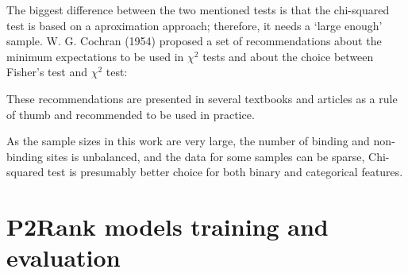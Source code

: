 The biggest difference between the two mentioned tests is that the chi-squared test is based on a aproximation approach; therefore, it needs a `large enough' sample. W. G. Cochran (1954) \cite{cochran} proposed a set of recommendations about the minimum expectations to be used in $\chi^{2}$ tests and about the choice between Fisher's test and $\chi^{2}$ test:


These recommendations are presented in several textbooks and articles as a rule of thumb \cite{} and recommended to be used in practice.

As the sample sizes in this work are very large, the number of binding and non-binding sites is unbalanced, and the data for some samples can be sparse, Chi-squared test is presumably better choice for both binary and categorical features.


\section{P2Rank models training and evaluation}




